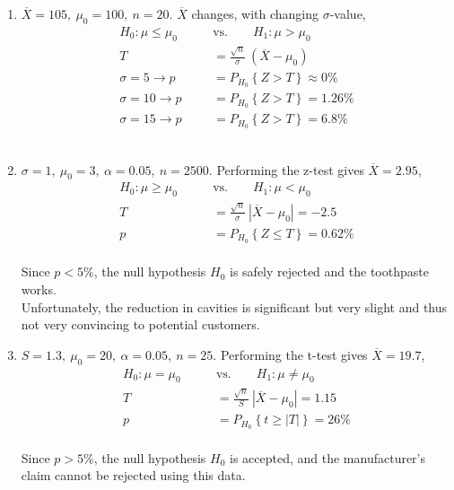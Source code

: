 \begin{enumerate}
	
	\item $ \overline{X} = 105,\ \mu_0 = 100,\ n = 20$. $ \overline{X} $ changes, with changing $ \sigma $-value,\\
	
		\begin{align}
			H_0 : \mu \leq \mu_0 \qquad &\text{vs.} \qquad H_1 : \mu > \mu_0 \nonumber \\
			T &= \frac{\sqrt{n}}{\sigma}\ (\overline{X} - \mu_0) \nonumber \\
			\sigma = 5 \to p &= P_{H_0}\left\{Z > T\right\} \approx 0\% \nonumber \\
			\sigma = 10 \to p &= P_{H_0}\left\{Z > T\right\} = 1.26\% \nonumber \\
			\sigma = 15 \to p &= P_{H_0}\left\{Z > T\right\} = 6.8\% 
		\end{align}\\
	
	
	\item $ \sigma = 1,\ \mu_0 = 3,\ \alpha = 0.05,\ n = 2500$. Performing the z-test gives $ \overline{X} = 2.95 $,\\
	
		\begin{align}
			H_0 : \mu \geq \mu_0 \qquad &\text{vs.} \qquad H_1 : \mu < \mu_0 \nonumber \\
			T &= \frac{\sqrt{n}}{\sigma}\ |\overline{X} - \mu_0| = -2.5 \nonumber \\
			p &= P_{H_0}\left\{Z \leq T\right\} = 0.62\% 
		\end{align}\\
		Since $ p < 5\% $, the null hypothesis $ H_0 $ is safely rejected and the toothpaste works.\\
		Unfortunately, the reduction in cavities is significant but very slight and thus not very convincing to potential customers.\\
	
	
	\item $ S = 1.3,\ \mu_0 = 20,\ \alpha = 0.05,\ n = 25$. Performing the t-test gives $ \overline{X} = 19.7 $,\\
	
		\begin{align}
			H_0 : \mu = \mu_0 \qquad &\text{vs.} \qquad H_1 : \mu \neq \mu_0 \nonumber \\
			T &= \frac{\sqrt{n}}{S}\ |\overline{X} - \mu_0| = 1.15 \nonumber \\
			p &= P_{H_0}\left\{t \geq |T|\right\} = 26\% 
		\end{align}\\
		Since $ p > 5\% $, the null hypothesis $ H_0 $ is accepted, and the manufacturer's claim cannot be rejected using this data.\\
	

\end{enumerate}
